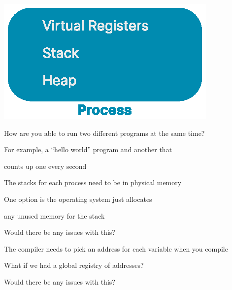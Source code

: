 \begin{slide}
  

  \centering
  \includegraphics{process-basic.eps}

\end{slide}

\begin{slide}
  

  How are you able to run two different programs at the same time?
  \medskip

  For example, a ``hello world'' program and another that
  
  \leftspace{}counts up one every second
\end{slide}

\begin{slide}
  

  The stacks for each process need to be in physical memory
  \medskip

  One option is the operating system just allocates
  
  \leftspace{}any unused memory for the stack
  \medskip

  Would there be any issues with this?
\end{slide}

\begin{slide}
  

  The compiler needs to pick an address for each variable when you compile
  \medskip

  What if we had a global registry of addresses?
  \medskip

  Would there be any issues with this?
\end{slide}

